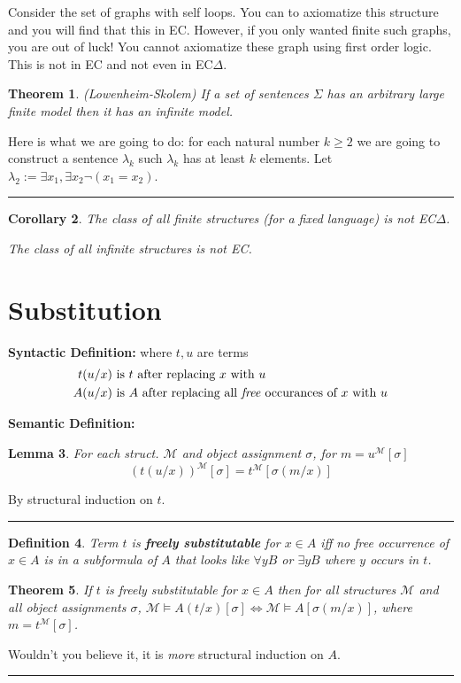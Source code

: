 \documentclass[twoside]{article}
\newcounter{lecnum}
\newtheorem{theorem}{Theorem}[lecnum]
\newtheorem{lemma}[theorem]{Lemma}
\newtheorem{corollary}[theorem]{Corollary}
\newtheorem{definition}[theorem]{Definition}
\newenvironment{proof}{{\bf Proof:}}{\hfill\rule{2mm}{2mm}}
\def\M{\mathcal{M}}
\begin{document}
Consider the set of graphs with self loops. You can to axiomatize this structure and you will find that this in EC. However, if you only wanted finite such graphs, you are out of luck! You cannot axiomatize these graph using first order logic. This is not in EC and not even in EC$\Delta$.

\begin{theorem}
(Lowenheim-Skolem) If a set of sentences $\Sigma$ has an arbitrary large finite model then it has an infinite model.
\end{theorem}
\begin{proof}
Here is what we are going to do: for each natural number $k \geq 2$ we are going to construct a sentence $\lambda_k$ such $\lambda_k$ has at least $k$ elements. Let $\lambda_2 := \exists x_1, \exists x_2 \lnot (x_1 = x_2)$. 
\end{proof}

\begin{corollary}
The class of all finite structures (for a fixed language) is not EC$\Delta$.

The class of all infinite structures is not EC.
\end{corollary}

\section{Substitution}
\textbf{Syntactic Definition:} where $t, u$ are terms
\begin{align*}
t(u/x) &\mbox{ is } t \mbox{ after replacing } x \mbox{ with } u \\
A(u/x) &\mbox{ is } A \mbox{ after replacing all \emph{free} occurances of } x \mbox{ with } u \\
\end{align*}

\textbf{Semantic Definition:} 
\begin{lemma}
For each struct. $\M$ and object assignment $\sigma$, for $m = u^{\M}[\sigma]$
\[(t(u/x))^{\M}[\sigma] = t^{\M}[\sigma(m/x)]\]
\end{lemma}
\begin{proof}
By structural induction on $t$.
\end{proof}

\begin{definition}
Term $t$ is \textbf{freely substitutable} for $x \in A$ iff no free occurrence of $x \in A$ is in a subformula of $A$ that looks like $\forall yB$ or $\exists yB$ where $y$ occurs in $t$. 
\end{definition}

\begin{theorem}
If $t$ is freely substitutable for $x \in A$ then for all structures $\M$ and all object assignments $\sigma$, $\M \vDash A(t/x)[\sigma] \iff \M \vDash A[\sigma (m/ x)]$, where $m = t^{\M}[\sigma]$.
\end{theorem}
\begin{proof}
Wouldn't you believe it, it is \emph{more} structural induction on $A$.
\end{proof}
\end{document}
